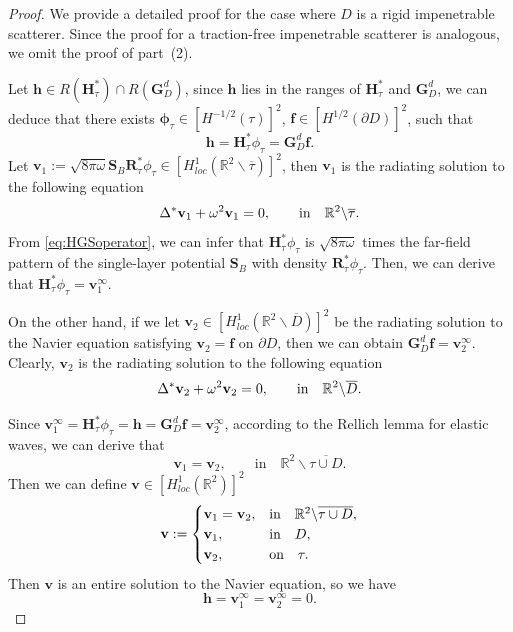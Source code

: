 \documentclass[11pt,reqno,twoside]{amsart}
\theoremstyle{definition}
\theoremstyle{remark}
\numberwithin{equation}{section}
\begin{document}
	\begin{proof}
	We provide a detailed proof for the case where $D$ is a rigid impenetrable scatterer. Since the proof for a traction-free impenetrable scatterer is analogous, we omit the proof of part~(2).

	
	Let $\mathbf h \in 	R\left( \mathbf H^*_{\tau} \right) \cap R\left( \mathbf G_D^d\right)$, since $\mathbf h$ lies in the ranges of $\mathbf H^*_{\tau}$ and $\mathbf G_D^d$, we can deduce that there exists $\mathbf{\phi} _{\tau} \in \left[H^{-1/2} \left(\tau \right) \right] ^2$, $\mathbf f \in \left[H^{1/2}\left(\partial D\right) \right] ^2$, such that
	$$
	\mathbf h= \mathbf H^*_{\tau} \phi _{\tau}= \mathbf G_D^d \mathbf f.
	$$
    Let $\mathbf v _1:= \sqrt{8\pi\omega} \mathbf S_B \mathbf R^*_{\tau} \phi _{\tau} \in \left[ H^1_{loc} \left( \mathbb R^2 \backslash \overline{\tau} \right) \right] ^2$, then $\mathbf v _1$ is the radiating solution to the following equation
	\begin{equation}\notag
			\Delta ^* \mathbf v _1 + \omega ^2 \mathbf v _1 =0,\qquad \mbox{in}\quad \mathbb R^2 \backslash \overline{\tau}.
	\end{equation}
	From \eqref{eq:HGSoperator}, we can infer that $\mathbf H^*_{\tau} \phi _{\tau}$ is $\sqrt{8\pi\omega}$ times the far-field pattern of the single-layer potential $\mathbf S_B$ with density $\mathbf R^*_{\tau} \phi _{\tau}$. Then, we can derive that $\mathbf H^*_{\tau} \phi _{\tau}= \mathbf v^{\infty} _1$. 
	
	On the other hand, if we let $\mathbf v _2 \in \left[ H^1_{loc} \left( \mathbb R^2 \backslash \overline{D} \right) \right] ^2$ be the radiating solution to the Navier equation satisfying $ \mathbf v _2= \mathbf f$ on $\partial D $, then we can obtain $ \mathbf G_D^d \mathbf f= \mathbf v^{\infty} _2$. Clearly, $\mathbf v _2 $ is the radiating solution to the following equation
   \begin{equation}\notag
	\Delta ^* \mathbf v _2 + \omega ^2 \mathbf v _2 =0,\qquad \mbox{in}\quad \mathbb R^2 \backslash \overline{D}.
   \end{equation}
   
	Since $\mathbf v^{\infty} _1=\mathbf H^*_{\tau} \phi _{\tau}= \mathbf h= \mathbf G_D^d \mathbf f= \mathbf v^{\infty} _2$, according to the Rellich lemma for elastic waves, we can derive that
	$$
	\mathbf v _1=\mathbf v _2, \qquad \mbox{in}\quad \mathbb R^2 \backslash \overline{\tau \cup D}.
	$$
	Then we can define $\mathbf v \in \left[ H^1_{loc} \left( \mathbb R^2 \right) \right] ^2$
	\begin{equation}\notag
		\mathbf v:=
		\begin{cases}
			\mathbf v _1=\mathbf v _2,& \mbox{in}\quad \mathbb R^2 \backslash \overline{\tau \cup D},\\
			\mathbf v _1, &  \mbox{in}\quad D ,	\\
			\mathbf v _2, &  \mbox{on}\quad \tau .
		\end{cases}
	\end{equation}
	Then $\mathbf v$ is an entire solution to the Navier equation, so we have
	$$
	\mathbf h= \mathbf v^{\infty} _1= \mathbf v^{\infty} _2 =0.
	$$
	

\end{proof}
\end{document}
